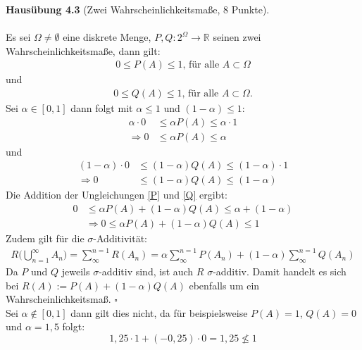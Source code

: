 \textbf{Hausübung 4.3} (Zwei Wahrscheinlichkeitsmaße, 8 Punkte).\\
\\
Es sei $\Omega \neq \emptyset$ eine diskrete Menge, $P,Q:2^\Omega \rightarrow \mathbb{R}$ seinen zwei Wahrscheinlichkeitsmaße, dann gilt:\\
\begin{equation*}
	\begin{split}
		0 \leq P(A) \leq 1 \text{, für alle } A \subset \Omega
	\end{split}
\end{equation*}
und
\begin{equation*}
	\begin{split}
		0 \leq Q(A) \leq 1 \text{, für alle } A \subset \Omega.
	\end{split}
\end{equation*}
Sei $\alpha \in [0,1]$ dann folgt mit $\alpha \leq 1$ und $(1-\alpha)\leq 1$:
\begin{equation}\label{P}
	\begin{split}
		\alpha \cdot 0 &\leq \alpha P(A) \leq \alpha \cdot 1\\
		\Rightarrow 0 &\leq \alpha P(A) \leq \alpha
	\end{split}
\end{equation}
und
\begin{equation}\label{Q}
	\begin{split}
		(1-\alpha) \cdot 0 &\leq (1-\alpha) Q(A) \leq (1-\alpha) \cdot 1\\
		\Rightarrow 0 &\leq (1-\alpha) Q(A) \leq (1-\alpha)
	\end{split}
\end{equation}
Die Addition der Ungleichungen \eqref{P} und \eqref{Q} ergibt:
\begin{equation*}
	\begin{split}
		0 &\leq \alpha P(A) + (1-\alpha) Q(A)\leq \alpha + (1-\alpha)\\
		&\Rightarrow 0 \leq \alpha P(A) + (1-\alpha) Q(A)\leq 1
	\end{split}
\end{equation*}
Zudem gilt für die $\sigma$-Additivität:
\begin{equation*}
	\begin{split}
		R\big(\bigcup\limits_{n=1}^{\infty} A_{n}\big) = \sum_{\infty}^{n=1}R(A_{n}) = \alpha \sum_{\infty}^{n=1}P(A_{n}) + (1-\alpha)\sum_{\infty}^{n=1}Q(A_{n})
	\end{split}
\end{equation*}
Da $P$ und $Q$ jeweils $\sigma$-additiv sind, ist auch $R$ $\sigma$-additiv.
Damit handelt es sich bei $ R(A) := P(A) + (1-\alpha) Q(A)$ ebenfalls um ein Wahrscheinlichkeitsmaß. $ \square $\\
Sei $\alpha \notin [0,1]$ dann gilt dies nicht, da für beispielsweise $P(A) = 1$, $Q(A) = 0 $ und $\alpha = 1,5$ folgt:
\begin{equation*}
	1,25 \cdot 1 + (-0,25) \cdot 0 = 1,25 \nleq 1
\end{equation*} 
